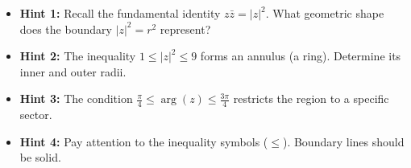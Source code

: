 \begin{hint}
\begin{itemize}[leftmargin=*]
    \item \textbf{Hint 1:} Recall the fundamental identity $z\bar{z} = |z|^2$. What geometric shape does the boundary $|z|^2 = r^2$ represent?
    \item \textbf{Hint 2:} The inequality $1 \le |z|^2 \le 9$ forms an annulus (a ring). Determine its inner and outer radii.
    \item \textbf{Hint 3:} The condition $\frac{\pi}{4} \le \arg(z) \le \frac{3\pi}{4}$ restricts the region to a specific sector.
    \item \textbf{Hint 4:} Pay attention to the inequality symbols ($\le$). Boundary lines should be solid.
\end{itemize}
\end{hint}

